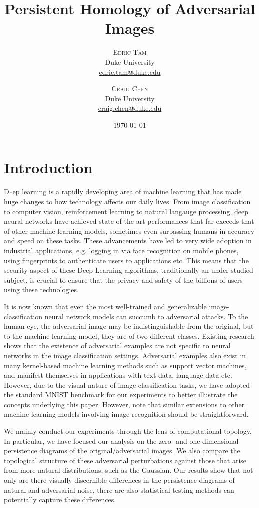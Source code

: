 \documentclass[twoside,twocolumn]{article}
\title{\LARGE Persistent Homology of Adversarial Images} %
\author{%
\textsc{Edric Tam}\\[1ex] %
\normalsize Duke University \\ %
\normalsize \href{mailto:edric.tam@duke.edu}{edric.tam@duke.edu} %
\and %
\textsc{Craig Chen}\\[1ex] %
\normalsize Duke University \\ %
\normalsize \href{mailto:craig.chen@duke.edu}{craig.chen@duke.edu} %
}
\date{\today} %
\begin{document}
\maketitle


\section{Introduction}

\lettrine[nindent=0em,lines=3]{D} eep learning is a rapidly developing area of machine learning that has made huge changes to how technology affects our daily lives. From image classification to computer vision, reinforcement learning to natural langauge processing, deep neural networks have achieved state-of-the-art performances that far exceeds that of other machine learning models, sometimes even surpassing humans in accuracy and speed on these tasks. These advancements have led to very wide adoption in industrial applications, e.g. logging in via face recognition on mobile phones, using fingerprints to authenticate users to applications etc. This means that the security aspect of these Deep Learning algorithms, traditionally an under-studied subject, is crucial to ensure that the privacy and safety of the billions of users using these technologies. 

It is now known that even the most well-trained and generalizable image-classification neural network models can succumb to adversarial attacks. To the human eye, the adversarial image may be indistinguishable from the original, but to the machine learning model, they are of two different classes. Existing research shows that the existence of adversarial examples are not specific to neural networks in the image classification settings. Adversarial examples also exist in many kernel-based machine learning methods such as support vector machines, and manifest themselves in applications with text data, language data etc. However, due to the visual nature of image classification tasks, we have adopted the standard MNIST benchmark for our experiments to better illustrate the concepts underlying this paper. However, note that similar extensions to other machine learning models involving image recognition should be straightforward. 

We mainly conduct our experiments through the lens of computational topology. In particular, we have focused our analysis on the zero- and one-dimensional persistence diagrams of the original/adversarial images. We also compare the topological structure of these adversarial perturbations against those that arise from more natural distributions, such as the Gaussian. Our results show that not only are there visually discernible differences in the persistence diagrams of natural and adversarial noise, there are also statistical testing methods can potentially capture these differences.
\end{document}
